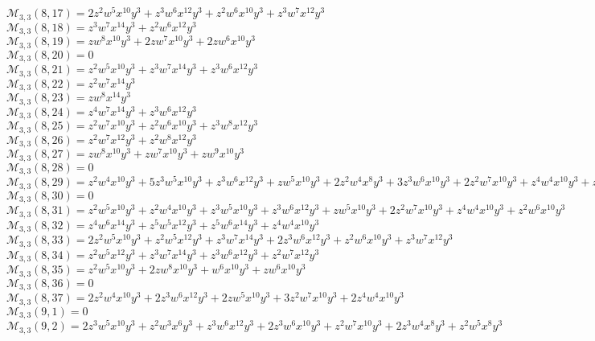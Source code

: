 $\mathcal{M}_{3,3}(8,17)=2z^2w^5x^{10}y^3+z^3w^6x^{12}y^3+z^2w^6x^{10}y^3+z^3w^7x^{12}y^3$\\
$\mathcal{M}_{3,3}(8,18)=z^3w^7x^{14}y^3+z^2w^6x^{12}y^3$\\
$\mathcal{M}_{3,3}(8,19)=zw^8x^{10}y^3+2zw^7x^{10}y^3+2zw^6x^{10}y^3$\\
$\mathcal{M}_{3,3}(8,20)=0$\\
$\mathcal{M}_{3,3}(8,21)=z^2w^5x^{10}y^3+z^3w^7x^{14}y^3+z^3w^6x^{12}y^3$\\
$\mathcal{M}_{3,3}(8,22)=z^2w^7x^{14}y^3$\\
$\mathcal{M}_{3,3}(8,23)=zw^8x^{14}y^3$\\
$\mathcal{M}_{3,3}(8,24)=z^4w^7x^{14}y^3+z^3w^6x^{12}y^3$\\
$\mathcal{M}_{3,3}(8,25)=z^2w^7x^{10}y^3+z^2w^6x^{10}y^3+z^3w^8x^{12}y^3$\\
$\mathcal{M}_{3,3}(8,26)=z^2w^7x^{12}y^3+z^2w^8x^{12}y^3$\\
$\mathcal{M}_{3,3}(8,27)=zw^8x^{10}y^3+zw^7x^{10}y^3+zw^9x^{10}y^3$\\
$\mathcal{M}_{3,3}(8,28)=0$\\
$\mathcal{M}_{3,3}(8,29)=z^2w^4x^{10}y^3+5z^3w^5x^{10}y^3+z^3w^6x^{12}y^3+zw^5x^{10}y^3+2z^2w^4x^8y^3+3z^3w^6x^{10}y^3+2z^2w^7x^{10}y^3+z^4w^4x^{10}y^3+z^2w^5x^8y^3$\\
$\mathcal{M}_{3,3}(8,30)=0$\\
$\mathcal{M}_{3,3}(8,31)=z^2w^5x^{10}y^3+z^2w^4x^{10}y^3+z^3w^5x^{10}y^3+z^3w^6x^{12}y^3+zw^5x^{10}y^3+2z^2w^7x^{10}y^3+z^4w^4x^{10}y^3+z^2w^6x^{10}y^3$\\
$\mathcal{M}_{3,3}(8,32)=z^4w^6x^{14}y^3+z^5w^5x^{12}y^3+z^5w^6x^{14}y^3+z^4w^4x^{10}y^3$\\
$\mathcal{M}_{3,3}(8,33)=2z^2w^5x^{10}y^3+z^2w^5x^{12}y^3+z^3w^7x^{14}y^3+2z^3w^6x^{12}y^3+z^2w^6x^{10}y^3+z^3w^7x^{12}y^3$\\
$\mathcal{M}_{3,3}(8,34)=z^2w^5x^{12}y^3+z^3w^7x^{14}y^3+z^3w^6x^{12}y^3+z^2w^7x^{12}y^3$\\
$\mathcal{M}_{3,3}(8,35)=z^2w^5x^{10}y^3+2zw^8x^{10}y^3+w^6x^{10}y^3+zw^6x^{10}y^3$\\
$\mathcal{M}_{3,3}(8,36)=0$\\
$\mathcal{M}_{3,3}(8,37)=2z^2w^4x^{10}y^3+2z^3w^6x^{12}y^3+2zw^5x^{10}y^3+3z^2w^7x^{10}y^3+2z^4w^4x^{10}y^3$\\
$\mathcal{M}_{3,3}(9,1)=0$\\
$\mathcal{M}_{3,3}(9,2)=2z^3w^5x^{10}y^3+z^2w^3x^6y^3+z^3w^6x^{12}y^3+2z^3w^6x^{10}y^3+z^2w^7x^{10}y^3+2z^3w^4x^8y^3+z^2w^5x^8y^3$\\

